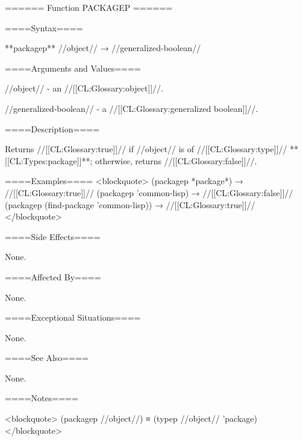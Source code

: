 ====== Function PACKAGEP ======

====Syntax====

**packagep** //object// → //generalized-boolean//

====Arguments and Values====

//object// - an //[[CL:Glossary:object]]//.

//generalized-boolean// - a //[[CL:Glossary:generalized boolean]]//.

====Description====

Returns //[[CL:Glossary:true]]// if //object// is of //[[CL:Glossary:type]]// **[[CL:Types:package]]**; otherwise, returns //[[CL:Glossary:false]]//.

====Examples==== <blockquote> (packagep *package*) → //[[CL:Glossary:true]]// (packagep 'common-lisp) → //[[CL:Glossary:false]]// (packagep (find-package 'common-lisp)) → //[[CL:Glossary:true]]// </blockquote>

====Side Effects====

None.

====Affected By====

None.

====Exceptional Situations====

None.

====See Also====

None.

====Notes====

<blockquote> (packagep //object//) ≡ (typep //object// 'package) </blockquote>

